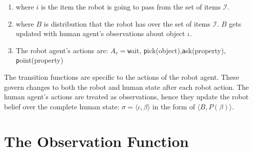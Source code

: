 \documentclass{article}
\newcommand{\myitem}{\stepcounter{enumi}\item[$*$\theenumi.]}
\begin{document}
\begin{enumerate}
\item where $i$ is the item the robot is going to pass from the set of items $\mathcal{I}$.
\item where $B$ is distribution that the robot has over the set of items $\mathcal{I}$. $B$ gets updated with human agent's observations about object $\iota$.

\item The robot agent's actions are: $A_r = ${{\texttt wait}, {\texttt pick(object)},{\texttt  ask(property)}, {\texttt  point(property)}}


\end{enumerate}
The transition functions are specific to the actions of the robot agent. These govern changes to both the robot and human state after each robot action.
 The human agent's actions are treated as observations, hence they update the robot belief over the complete human state: $\sigma = \langle \iota, \beta \rangle$ in the form of $\langle B, P(\beta)  \rangle$. 
 
 
 \section{The Observation Function}
\end{document}
